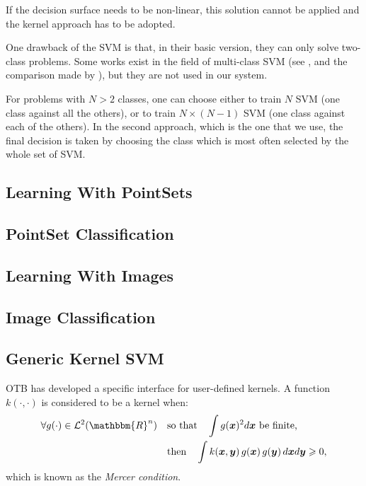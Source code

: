 	If the decision surface needs to be non-linear, this solution
	cannot be applied and the kernel approach has to be adopted.


One drawback of the SVM is that, in their basic version, they can only
solve two-class problems. Some works exist in the field of multi-class
SVM (see \cite{allwein00reducing,weston98multiclass}, and the
comparison made by \cite{hsu01comparison}), but they are
not used in our system.

For problems with $N > 2$ classes, one can choose either to train $N$
SVM (one class against all the others), or to train $N\times(N-1)$ SVM
(one class against each of the others). In the second approach, which
is the one that we use, the final decision is taken by choosing the
class which is most often selected by the whole set of SVM.


\subsection{Learning With PointSets}
\label{sec:LearningWithPointSets}

\subsection{PointSet Classification}
\label{sec:PointSetClassification}

\subsection{Learning With Images}
\label{sec:LearningWithImages}

\subsection{Image Classification}
\label{sec:ImageClassification}


\subsection{Generic Kernel SVM}

OTB has developed a specific interface for user-defined kernels. A function
$k(\cdot,\cdot)$ is considered to be a kernel when:
\begin{align}\label{eqMercer}
        \forall g(\cdot) \in {\cal L}^2(\mathbbm{R}^n) \quad & \text{so 
that} \quad
        \int g(\boldsymbol{x})^2 d\boldsymbol{x} \text{ be finite,} \\
        & \text{then} \quad \int k(\boldsymbol{x},\boldsymbol{y}) \, 
g(\boldsymbol{x})
        \, g(\boldsymbol{y}) \, d\boldsymbol{x} d\boldsymbol{y} \geqslant 0,
        \notag
\end{align}
which is known as the {\em Mercer condition\/}.

